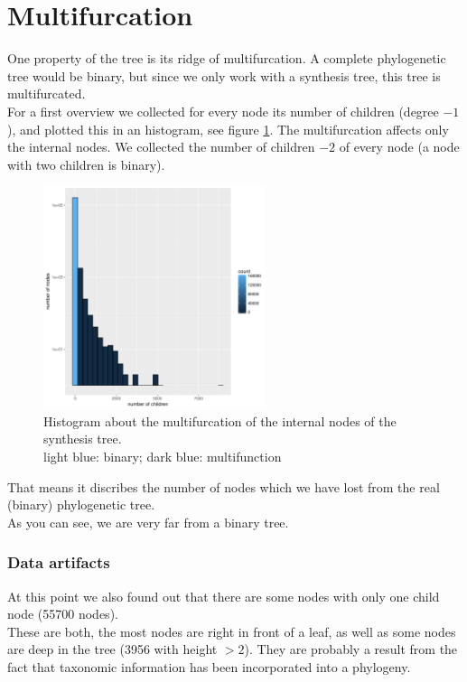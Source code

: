     \section{Multifurcation}\label{sec:ResultsMultifurcation}
      One property of the tree is its ridge of multifurcation. A complete phylogenetic tree would be 
        binary, but since we only work with a synthesis tree, this tree is multifurcated. \\
      For a first overview we collected for every node its number of children (degree $-1$), and plotted
        this in an histogram, see figure \ref{fig:childrenOfNodes}. The multifurcation affects only the
        internal nodes. We collected the number of children $-2$ of every node (a node with two children 
        is binary). 
      \begin{figure}
        \begin{center}
          \includegraphics[trim = 0mm 0mm 30mm 0mm, clip, width=0.58\textwidth]{Figures/multifurc.pdf}
        \end{center}
        \caption{Histogram about the multifurcation of the internal nodes of the synthesis tree. \\ 
          light blue: binary; dark blue: multifunction}
        \label{fig:childrenOfNodes}
      \end{figure}
      That means it discribes the number of nodes which we have lost from the real (binary) 
      phylogenetic tree. \\
      As you can see, we are very far from a binary tree.
    
      \subsubsection{Data artifacts}
      At this point we also found out that there are some nodes with only one child node (55700 nodes). \\
      These are both, the most nodes are right in front of a leaf, as well as some nodes are deep in the 
        tree (3956 with height $>2$). They are probably a result from the fact that taxonomic information 
        has been incorporated into a phylogeny. \\

